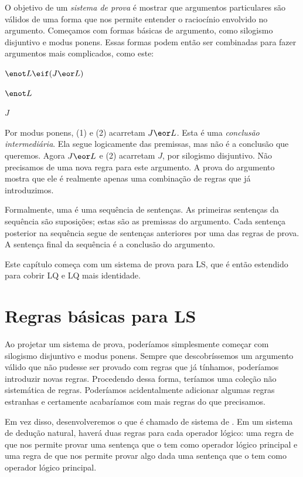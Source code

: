 O objetivo de um \emph{sistema de prova} é mostrar que argumentos particulares são válidos de uma forma que nos permite entender o raciocínio envolvido no argumento. Começamos com formas básicas de argumento, como silogismo disjuntivo e modus ponens. Essas formas podem então ser combinadas para fazer argumentos mais complicados, como este:
\begin{earg}
\item[(1)] $\enot L \eif (J \eor L)$
\item[(2)] $\enot L$
\item[\therefore] $J$
\end{earg}
Por modus ponens, (1) e (2) acarretam $J \eor L$. Esta é uma \emph{conclusão intermediária}. Ela segue logicamente das premissas, mas não é a conclusão que queremos. Agora $J \eor L$ e (2) acarretam $J$, por silogismo disjuntivo. Não precisamos de uma nova regra para este argumento. A prova do argumento mostra que ele é realmente apenas uma combinação de regras que já introduzimos.

Formalmente, uma  é uma sequência de sentenças. As primeiras sentenças da sequência são suposições; estas são as premissas do argumento. Cada sentença posterior na sequência segue de sentenças anteriores por uma das regras de prova. A sentença final da sequência é a conclusão do argumento.

Este capítulo começa com um sistema de prova para LS, que é então estendido para cobrir LQ e LQ mais identidade.


\section{Regras básicas para LS}

Ao projetar um sistema de prova, poderíamos simplesmente começar com silogismo disjuntivo e modus ponens. Sempre que descobríssemos um argumento válido que não pudesse ser provado com regras que já tínhamos, poderíamos introduzir novas regras. Procedendo dessa forma, teríamos uma coleção não sistemática de regras. Poderíamos acidentalmente adicionar algumas regras estranhas e certamente acabaríamos com mais regras do que precisamos.

Em vez disso, desenvolveremos o que é chamado de sistema de . Em um sistema de dedução natural, haverá duas regras para cada operador lógico: uma regra de  que nos permite provar uma sentença que o tem como operador lógico principal e uma regra de  que nos permite provar algo dada uma sentença que o tem como operador lógico principal.

